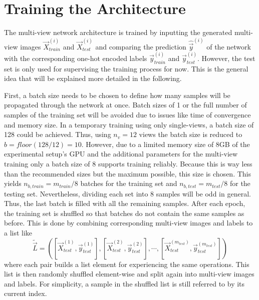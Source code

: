 \section{Training the Architecture}
\label{sec:methods-training}
The multi-view network architecture is trained by inputting the generated multi-view images $\vec{X}_{train}^{(i)}$ and $\vec{X}_{test}^{(i)}$ and comparing the prediction $\hat{\vec{y}}^{(i)}$ of the network with the corresponding one-hot encoded labels $\vec{y}_{train}^{(i)}$ and $\vec{y}_{test}^{(i)}$.
However, the test set is only used for supervising the training process for now.
This is the general idea that will be explained more detailed in the following.

First, a batch size needs to be chosen to define how many samples will be propagated through the network at once.
Batch sizes of 1 or the full number of samples of the training set will be avoided due to issues like time of convergence and memory size.
In a temporary training using only single-views, a batch size of 128 could be achieved.
Thus, using $n_v = 12$ views the batch size is reduced to $b = floor(128 / 12) = 10$.
However, due to a limited memory size of 8GB of the experimental setup's GPU and the additional parameters for the multi-view training only a batch size of 8 supports training reliably.
Because this is way less than the recommended sizes but the maximum possible, this size is chosen.
This yields $n_{b,train} = m_{train} / 8$ batches for the training set and $n_{b,test} = m_{test} / 8$ for the testing set.
Nevertheless, dividing each set into 8 samples will be odd in general.
Thus, the last batch is filled with all the remaining samples.
After each epoch, the training set is shuffled so that batches do not contain the same samples as before.
This is done by combining corresponding multi-view images and labels to a list like
\begin{equation}
\tilde{\vec{L}} = \left( \left[ \vec{X}_{test}^{(1)}, \vec{y}_{test}^{(1)} \right], \left[ \vec{X}_{test}^{(2)}, \vec{y}_{test}^{(2)} \right], \cdots , \left[ \vec{X}_{test}^{(m_{test})}, \vec{y}_{test}^{(m_{test})} \right] \right)
\end{equation}
where each pair builds a list element for experiencing the same operations.
This list is then randomly shuffled element-wise and split again into multi-view images and labels.
For simplicity, a sample in the shuffled list is still referred to by its current index.

